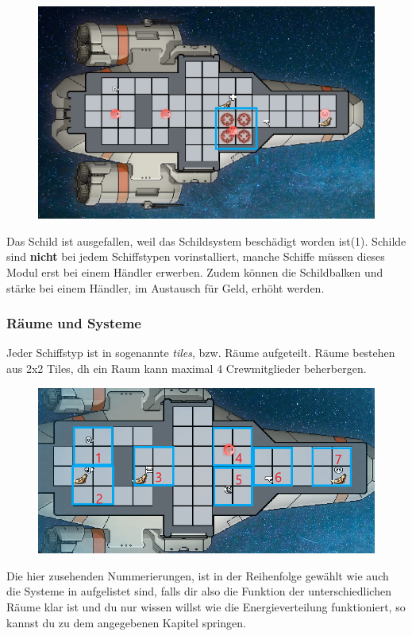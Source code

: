 \documentclass[fontsize=12pt,paper=a4,twoside]{scrartcl}
\begin{document}
\begin{figure}[H]
\centering
\includegraphics[width=0.9\linewidth]{DasSpiel/Ui/shield_off.png}
\end{figure}

Das Schild ist ausgefallen, weil das Schildsystem beschädigt worden ist(1). Schilde sind \textbf{nicht} bei jedem Schiffstypen vorinstalliert, manche Schiffe müssen dieses Modul erst bei einem Händler erwerben. Zudem können die Schildbalken und stärke bei einem Händler, im Austausch für Geld, erhöht werden.  

\subsubsection{Räume und Systeme} \label{sec:Systeme}
Jeder Schiffstyp ist in sogenannte \textit{tiles}, bzw. Räume aufgeteilt. Räume bestehen aus 2x2 Tiles, dh ein Raum kann maximal 4 Crewmitglieder beherbergen.

\begin{figure}[H]
\centering
\includegraphics[width=1\linewidth]{DasSpiel/Ui/tiles.png}
\end{figure}

Die hier zusehenden Nummerierungen, ist in der Reihenfolge gewählt wie auch die Systeme in  aufgelistet sind, falls dir also die Funktion der unterschiedlichen Räume klar ist und du nur wissen willst wie die Energieverteilung funktioniert, so kannst du zu dem angegebenen Kapitel springen.
\end{document}
